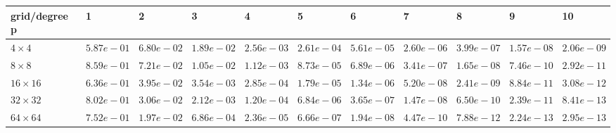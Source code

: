 \begin{tabular}{lllllllllll}
\hline
 grid/degree p   & 1          & 2          & 3          & 4          & 5          & 6          & 7          & 8          & 9          & 10         \\
\hline
 $4 \times 4$    & $5.87e-01$ & $6.80e-02$ & $1.89e-02$ & $2.56e-03$ & $2.61e-04$ & $5.61e-05$ & $2.60e-06$ & $3.99e-07$ & $1.57e-08$ & $2.06e-09$ \\
 $8 \times 8$    & $8.59e-01$ & $7.21e-02$ & $1.05e-02$ & $1.12e-03$ & $8.73e-05$ & $6.89e-06$ & $3.41e-07$ & $1.65e-08$ & $7.46e-10$ & $2.92e-11$ \\
 $16 \times 16$  & $6.36e-01$ & $3.95e-02$ & $3.54e-03$ & $2.85e-04$ & $1.79e-05$ & $1.34e-06$ & $5.20e-08$ & $2.41e-09$ & $8.84e-11$ & $3.08e-12$ \\
 $32 \times 32$  & $8.02e-01$ & $3.06e-02$ & $2.12e-03$ & $1.20e-04$ & $6.84e-06$ & $3.65e-07$ & $1.47e-08$ & $6.50e-10$ & $2.39e-11$ & $8.41e-13$ \\
 $64 \times 64$  & $7.52e-01$ & $1.97e-02$ & $6.86e-04$ & $2.36e-05$ & $6.66e-07$ & $1.94e-08$ & $4.47e-10$ & $7.88e-12$ & $2.24e-13$ & $2.95e-13$ \\
\hline
\end{tabular}